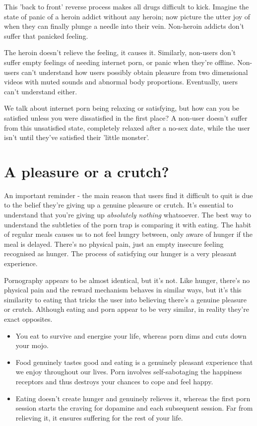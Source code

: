 \documentclass[
]{book}
\begin{document}
This 'back to front' reverse process makes all drugs difficult to kick. Imagine the state of panic of a heroin addict without any heroin; now picture the utter joy of when they can finally plunge a needle into their vein. Non-heroin addicts don't suffer that panicked feeling.

The heroin doesn't relieve the feeling, it causes it. Similarly, non-users don't suffer empty feelings of needing internet porn, or panic when they're offline. Non-users can't understand how users possibly obtain pleasure from two dimensional videos with muted sounds and abnormal body proportions. Eventually, users can't understand either.

We talk about internet porn being relaxing or satisfying, but how can you be satisfied unless you were dissatisfied in the first place? A non-user doesn't suffer from this unsatisfied state, completely relaxed after a no-sex date, while the user isn't until they've satisfied their 'little monster'.

\hypertarget{a-pleasure-or-a-crutch}{%
\section{A pleasure or a crutch?}\label{a-pleasure-or-a-crutch}}

An important reminder - the main reason that users find it difficult to quit is due to the belief they're giving up a genuine pleasure or crutch. It's essential to understand that you're giving up \emph{absolutely nothing} whatsoever. The best way to understand the subtleties of the porn trap is comparing it with eating. The habit of regular meals causes us to not feel hungry between, only aware of hunger if the meal is delayed. There's no physical pain, just an empty insecure feeling recognised as hunger. The process of satisfying our hunger is a very pleasant experience.

Pornography appears to be almost identical, but it's not. Like hunger, there's no physical pain and the reward mechanism behaves in similar ways, but it's this similarity to eating that tricks the user into believing there's a genuine pleasure or crutch. Although eating and porn appear to be very similar, in reality they're exact opposites.

\begin{itemize}
\item
  You eat to survive and energise your life, whereas porn dims and cuts down your mojo.
\item
  Food genuinely tastes good and eating is a genuinely pleasant experience that we enjoy throughout our lives. Porn involves self-sabotaging the happiness receptors and thus destroys your chances to cope and feel happy.
\item
  Eating doesn't create hunger and genuinely relieves it, whereas the first porn session starts the craving for dopamine and each subsequent session. Far from relieving it, it ensures suffering for the rest of your life.
\end{itemize}
\end{document}
